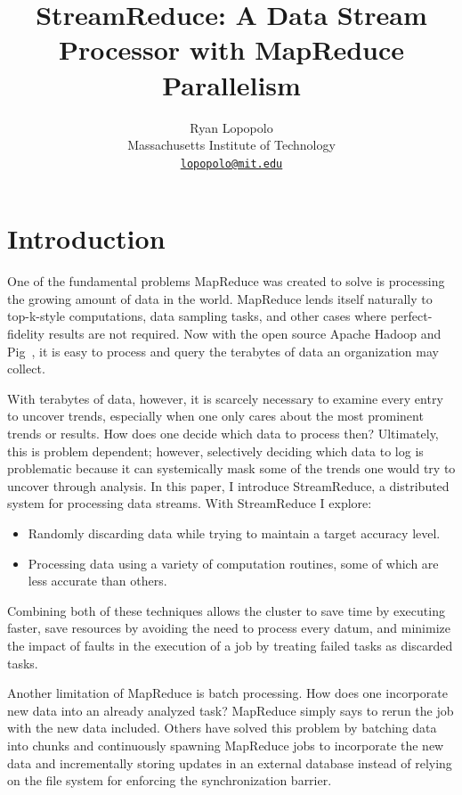 \documentclass[12pt,twocolumn]{article}
\title{StreamReduce: A Data Stream Processor with MapReduce Parallelism}
\author{Ryan Lopopolo\\
Massachusetts Institute of Technology\\
\href{mailto:lopopolo@mit.edu}{\texttt{lopopolo@mit.edu}}}
\begin{document}
\maketitle

\section{Introduction}
\label{sec:intro}
One of the fundamental problems MapReduce was created to solve is processing
the growing amount of data in the world.
MapReduce lends itself naturally to top-k-style computations,
data sampling tasks, and other cases where perfect-fidelity results are not required.
Now with the open source Apache Hadoop
and Pig~\cite{Olston:2008:PLN:1376616.1376726}, it is easy to process and query
the terabytes of data an organization may collect.

With terabytes of data, however, it is scarcely necessary to examine
every entry to uncover trends, especially when one only cares about the most prominent
trends or results.
How does one decide which data to process then? Ultimately, this is problem dependent;
however, selectively deciding which data to
log is problematic because it can systemically mask some of the trends one would
try to uncover through analysis. In this paper, I introduce StreamReduce, a distributed
system
for processing data streams. With StreamReduce I explore:
\begin{itemize}
  \item
    Randomly discarding data while trying to maintain a target accuracy level.
  \item
    Processing data using a variety of computation routines, some of which are less
    accurate than others.
\end{itemize}
Combining both of these techniques allows the cluster to save time by executing faster,
save resources by avoiding the need to process every datum, and minimize the impact of
faults
in the execution of a job by treating failed tasks as discarded tasks.

Another limitation of MapReduce is batch processing. How does one
incorporate new data into an already analyzed task? MapReduce simply says to rerun
the job with the new data included. Others have solved this problem by batching data
into chunks and continuously spawning MapReduce jobs to incorporate the new data
and incrementally storing updates in an external database instead of relying on
the file system for enforcing the synchronization barrier.
\end{document}
